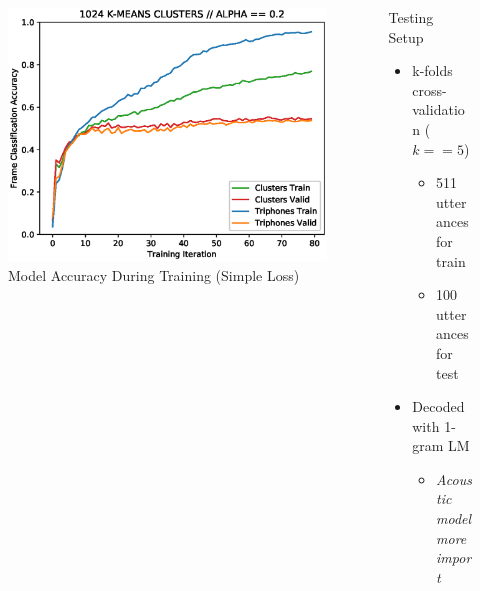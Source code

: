 \documentclass[final]{beamer} %
\newlength{\columnheight}
\begin{document}
\begin{frame}
\begin{columns}
\begin{column}{0.3\textwidth}
{        \vfill

        \begin{figure}[!htbp]
          \centering
          \minipage{\textwidth}
          \centering
          \includegraphics[width=.8\linewidth]{figs/1_point_2_1024.eps}
          \caption{Model Accuracy During Training (Simple Loss)}
          \endminipage\hfill
        \end{figure}

        

        
      } %
    \end{column}

    
    \begin{column}{0.3\textwidth}
      \parbox[t][\columnheight]{.9\textwidth}{
        \vspace{1cm}               %

        
        \begin{block}{\boxnumber Testing Setup}
          \begin{itemize}
          \item k-folds cross-validation ($k==5$)
            \begin{itemize}
            \item 511 utterances for train
            \item 100 utterances for test
            \end{itemize}
          \item Decoded with 1-gram LM
            \begin{itemize}
            \item \textit{Acoustic model more import}
            \end{itemize}
          \end{itemize}
        \end{block}

}
\end{column}
\end{columns}
\end{frame}
\end{document}
